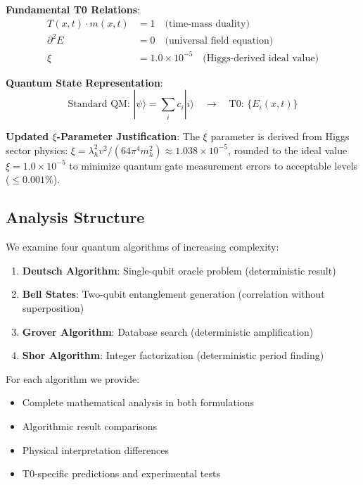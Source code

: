 \documentclass[12pt,a4paper]{article}
\newcommand{\Efield}{E}
\begin{document}
	\begin{tcolorbox}[colback=blue!5!white,colframe=blue!75!black,title=Core T0 Principles with Updated $\xi$ Parameter]
		\textbf{Fundamental T0 Relations}:
		\begin{align}
			T(x,t) \cdot m(x,t) &= 1 \quad \text{(time-mass duality)} \\
			\partial^2 \Efield &= 0 \quad \text{(universal field equation)} \\
			\xi &= 1.0 \times 10^{-5} \quad \text{(Higgs-derived ideal value)}
		\end{align}
		
		\textbf{Quantum State Representation}:
		\begin{equation}
			\text{Standard QM: } |\psi\rangle = \sum_i c_i |i\rangle \quad \rightarrow \quad \text{T0: } \{\Efield_i(x,t)\}
		\end{equation}
		
		\textbf{Updated $\xi$-Parameter Justification}:
		The $\xi$ parameter is derived from Higgs sector physics: $\xi = \lambda_h^2 v^2/(64\pi^4 m_h^2) \approx 1.038 \times 10^{-5}$, rounded to the ideal value $\xi = 1.0 \times 10^{-5}$ to minimize quantum gate measurement errors to acceptable levels ($\leq 0.001\%$).
	\end{tcolorbox}
	
	\subsection{Analysis Structure}
	
	We examine four quantum algorithms of increasing complexity:
	
	\begin{enumerate}
		\item \textbf{Deutsch Algorithm}: Single-qubit oracle problem (deterministic result)
		\item \textbf{Bell States}: Two-qubit entanglement generation (correlation without superposition)
		\item \textbf{Grover Algorithm}: Database search (deterministic amplification)
		\item \textbf{Shor Algorithm}: Integer factorization (deterministic period finding)
	\end{enumerate}
	
	For each algorithm we provide:
	\begin{itemize}
		\item Complete mathematical analysis in both formulations
		\item Algorithmic result comparisons
		\item Physical interpretation differences
		\item T0-specific predictions and experimental tests
	\end{itemize}
	
\end{document}
